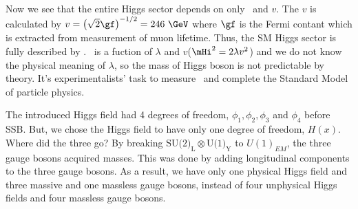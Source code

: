 Now we see that the entire Higgs sector depends on only \mHi\ and $v$.
The $v$ is calculated by $v = \left( \sqrt{2} \gf \right)^{-1/2} = 246~\GeV$  
where $\gf$ is the Fermi contant which is extracted from measurement 
of muon lifetime. 
Thus, the SM Higgs sector is fully described by \mHi. 
\mHi\ is a fuction of $\lambda$ and $v$($\mHi^2 = 2 \lambda v^2$)
and we do not know the physical meaning of $\lambda$, so 
the mass of Higgs boson is not predictable by theory.
It's experimentalists' task to measure \mHi\ and 
complete the Standard Model of particle physics.

The introduced Higgs field had 4 degrees of freedom, $\phi_1, \phi_2, \phi_3$ 
and $\phi_4$ before SSB. But, we chose the Higgs field to have only one degree 
of freedom, $H(x)$.  Where did the three go? 
By breaking $\textrm{SU(2)}_\textrm{L} \otimes \textrm{U(1)}_\textrm{Y}$ to $U(1)_{EM}$, 
the three gauge bosons acquired masses. This was done by adding longitudinal components 
to the three gauge bosons. As a result, we have only one physical Higgs field and 
three massive and one massless gauge bosons, instead of four unphysical 
Higgs fields and four massless gauge bosons.

